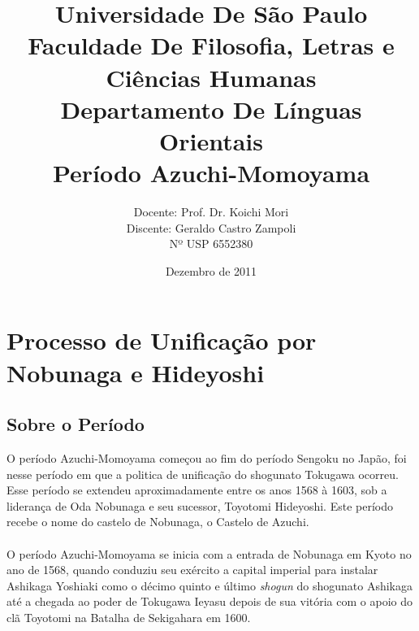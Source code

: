 \documentclass[12pt, a4paper]{article}
\title{Universidade De São Paulo\\
    Faculdade De Filosofia, Letras e Ciências Humanas\\
    Departamento De Línguas Orientais\\
    \vspace{3cm}
    \textbf{\Huge{Período Azuchi-Momoyama}}\\
    \vspace{4cm}}
\author{Docente: Prof. Dr. Koichi Mori\\
    Discente: Geraldo Castro Zampoli\\
    Nº USP 6552380}
\date{Dezembro de 2011}
\begin{document}
    \maketitle
    \newpage
    
    \section {Processo de Unificação por Nobunaga e Hideyoshi}
		\subsection {Sobre o Período}
			O período Azuchi-Momoyama começou ao fim do período Sengoku no Japão, foi nesse período em que a politica de unificação do shogunato Tokugawa ocorreu. Esse período se extendeu aproximadamente entre os anos 1568 à 1603, sob a liderança de Oda Nobunaga e seu sucessor, Toyotomi Hideyoshi. Este período recebe o nome do castelo de Nobunaga, o Castelo de Azuchi.	\\
			\\
			\indent O período Azuchi-Momoyama se inicia com a entrada de Nobunaga em Kyoto no ano de 1568, quando conduziu seu exército a capital imperial para instalar Ashikaga Yoshiaki como o décimo quinto e último \textit{shogun} do shogunato Ashikaga até a chegada ao poder de Tokugawa Ieyasu depois de sua vitória com o apoio do clã Toyotomi na Batalha de Sekigahara em 1600.\\
\end{document}
